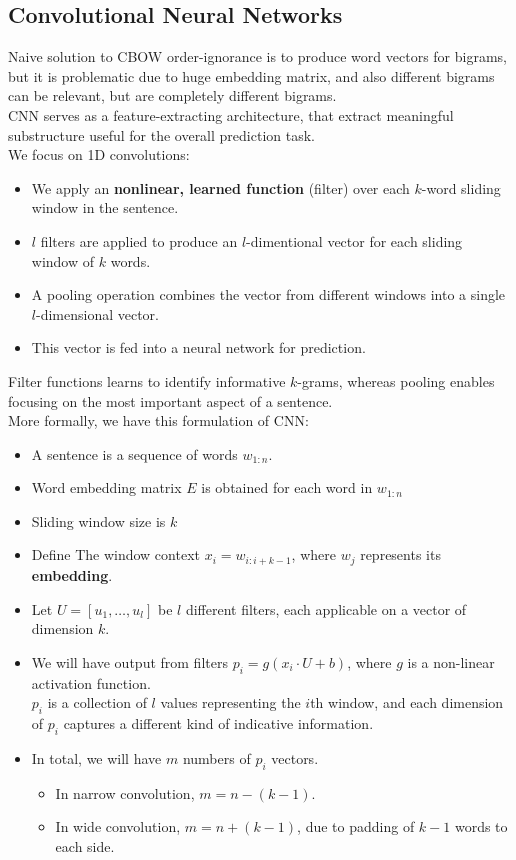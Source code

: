 \documentclass[12pt]{article}
\theoremstyle{definition}
\begin{document}
 \subsection{Convolutional Neural Networks}
 Naive solution to CBOW order-ignorance is to produce word vectors for bigrams, but it is problematic due to huge embedding matrix, and also different bigrams can be relevant, but are completely different bigrams.\\
 CNN serves as a feature-extracting architecture, that extract meaningful substructure useful for the overall prediction task.\\
 We focus on 1D convolutions:
 \begin{itemize}
 	\item We apply an \textbf{nonlinear, learned function} (filter) over each $k$-word sliding window in the sentence.
 	\item $l$ filters are applied to produce an $l$-dimentional vector for each sliding window of $k$ words.
 	\item A pooling operation combines the vector from different windows into a single $l$-dimensional vector.
 	\item This vector is fed into a neural network for prediction.
 \end{itemize}
 Filter functions learns to identify informative $k$-grams, whereas pooling enables focusing on the most important aspect of a sentence.\\
More formally, we have this formulation of CNN:
\begin{itemize}
	\item A sentence is a sequence of words $w_{1:n}$.
	\item Word embedding matrix $E$ is obtained for each word in $w_{1:n}$
	\item Sliding window size is $k$
	\item Define The window context $x_i = w_{i: i+ k - 1}$, where $w_j$ represents its \textbf{embedding}.
	\item Let $U=[u_1, \ldots, u_l]$ be $l$ different filters, each applicable on a vector of dimension $k$.
	\item We will have output from filters $p_i = g(x_i\cdot U + b)$, where $g$ is a non-linear activation function. \\
	$p_i$ is a collection of $l$ values representing the $i$th window, and each dimension of $p_i$ captures a different kind of indicative information.
	\item In total, we will have $m$ numbers of $p_i$ vectors.
	\begin{itemize}
		\item In narrow convolution, $m = n - (k - 1)$.
		\item In wide convolution, $m = n + (k-1)$, due to padding of $k-1$ words to each side.
	\end{itemize}
\end{itemize}
\end{document}
